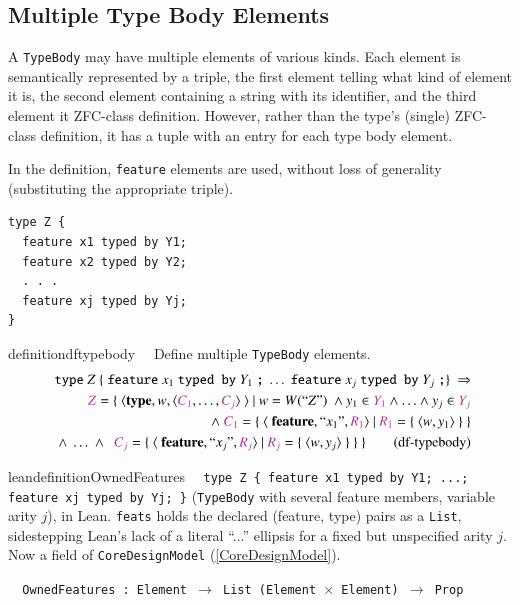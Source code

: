 \subsection{Multiple Type Body Elements}

\pn A \texttt{TypeBody} may have multiple elements of various kinds.  Each element is semantically represented by a triple, the first element telling what kind of element it is, the second element containing a string with its identifier, and the third element it ZFC-class definition.
However, rather than the type's (single) ZFC-class definition, it has a tuple with an entry for each type body element.

\pn In the definition, \texttt{feature} elements are used, without loss of generality (substituting the appropriate triple).

\begin{lstlisting}
type Z {
  feature x1 typed by Y1;
  feature x2 typed by Y2;
  . . .
  feature xj typed by Yj;
}
\end{lstlisting}

\begin{restatable}{definition}{dftypebody}~~   Define multiple \texttt{TypeBody} elements.
\begin{align}
\texttt{type}~ Z~\{~ \texttt{feature}~ x_1 ~\texttt{typed by}~ Y_1~\texttt{;}~\ldots~
  \texttt{feature}~ x_j ~\texttt{typed by}~ Y_j~\texttt{;}\}~\Rightarrow  \notag \\
\mc{Z}=\{~\langle \textbf{type},w,\langle \mc{C_1},\ldots,\mc{C_j}\rangle~\rangle~\vert~w=W(``Z")~\wedge y_1 \in \mc{Y_1} \wedge\ldots\wedge y_j \in \mc{Y_j} \notag \\
~\wedge~ \mc{C_1}=\{~\langle~\textbf{feature}, ``x_1",\mc{R_1} \rangle~\vert ~\mc{R_1}=\{~\langle w,y_1\rangle~\}~\} \notag \\
~~~\wedge~\ldots~\wedge %
~~\mc{C_j}=\{~\langle~\textbf{feature}, ``x_j",\mc{R_j} \rangle~\vert ~\mc{R_j}=\{~\langle w,y_j\rangle~\}~\} ~\}
\label{eq:df-typebody}\tag{df-typebody}
\end{align}
\end{restatable}

\begin{restatable}{leandefinition}{OwnedFeatures}~~ \texttt{type Z \{ feature x1 typed by
Y1; ...; feature xj typed by Yj; \}} (\texttt{TypeBody} with several feature members, variable arity $j$), in
Lean. \texttt{feats} holds the declared (feature, type) pairs as a \texttt{List}, sidestepping Lean's lack of
a literal ``...'' ellipsis for a fixed but unspecified arity $j$. Now a field of \texttt{CoreDesignModel}
(\ref{CoreDesignModel}).

\texttt{~~OwnedFeatures : Element $\to$ List (Element $\times$ Element) $\to$ Prop}
\label{OwnedFeatures}
\end{restatable}

